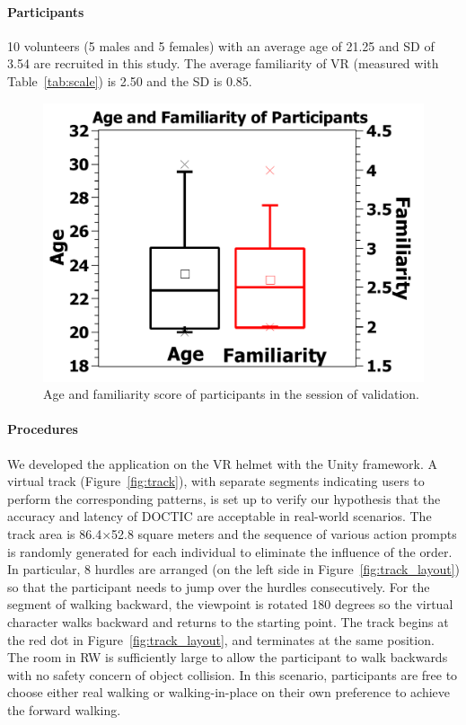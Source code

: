 \documentclass[review]{vgtc}                 %
\begin{document}
\paragraph{Participants} 10 volunteers (5 males and 5 females) with an average age of 21.25 and SD of 3.54 are recruited in this study. 
The average familiarity of VR (measured with Table~\ref{tab:scale}) is 2.50 and the SD is 0.85. 
\begin{figure}[h]
	\centering
	\includegraphics[width=\linewidth]{figs/testing_users.pdf}
	\caption{Age and familiarity score of participants in the session of validation.}
	\label{fig:testing_users}
\end{figure}

\paragraph{Procedures}
We developed the application on the VR helmet with the Unity framework.
A virtual track (Figure~\ref{fig:track}), with separate segments indicating users to perform the corresponding patterns, is set up to verify our hypothesis that the accuracy and latency of DOCTIC are acceptable in real-world scenarios. The track area is 86.4$\times$52.8 square meters and the sequence of various action prompts is randomly generated for each individual to eliminate the influence of the order. In particular, 8 hurdles are arranged  (on the left side in Figure~\ref{fig:track_layout}) so that the participant needs to jump over the hurdles consecutively. For the segment of walking backward, the viewpoint is rotated 180 degrees so the virtual character walks backward and returns to the starting point. 
The track begins at the red dot in Figure~\ref{fig:track_layout}, and terminates at the same position. 
The room in RW is sufficiently large to allow the participant to walk backwards with no safety concern of object collision. In this scenario, participants are free to choose either real walking or walking-in-place on their own preference to achieve the forward walking.
\end{document}
